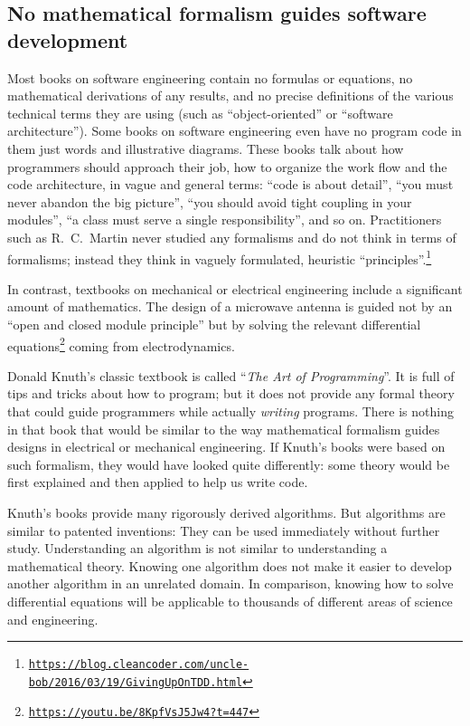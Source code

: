 \subsection{No mathematical formalism guides software development}

Most books on software engineering contain no formulas or equations,
no mathematical derivations of any results, and no precise definitions
of the various technical terms they are using (such as ``object-oriented''
or ``software architecture''). Some books on software engineering
even have no program code in them \textendash{} just words and illustrative
diagrams. These books talk about how programmers should approach their
job, how to organize the work flow and the code architecture, in vague
and general terms: ``code is about detail'', ``you must never abandon
the big picture'', ``you should avoid tight coupling in your modules'',
``a class must serve a single responsibility'', and so on. Practitioners
such as R.\ C.\ Martin never studied any formalisms and do not think
in terms of formalisms; instead they think in vaguely formulated,
heuristic \textquotedblleft principles\textquotedblright .\footnote{\texttt{\href{https://blog.cleancoder.com/uncle-bob/2016/03/19/GivingUpOnTDD.html}{https://blog.cleancoder.com/uncle-bob/2016/03/19/GivingUpOnTDD.html}}}

In contrast, textbooks on mechanical or electrical engineering include
a significant amount of mathematics. The design of a microwave antenna
is guided not by an ``open and closed module principle'' but by
solving the relevant differential equations\footnote{\texttt{\href{https://youtu.be/8KpfVsJ5Jw4?t=447}{https://youtu.be/8KpfVsJ5Jw4?t=447}}}
coming from electrodynamics.

Donald Knuth's classic textbook is called ``\emph{The Art of Programming}''.
It is full of tips and tricks about how to program; but it does not
provide any formal theory that could guide programmers while actually
\emph{writing} programs. There is nothing in that book that would
be similar to the way mathematical formalism guides designs in electrical
or mechanical engineering. If Knuth's books were based on such formalism,
they would have looked quite differently: some theory would be first
explained and then applied to help us write code.

Knuth's books provide many rigorously derived algorithms. But algorithms
are similar to patented inventions: They can be used immediately without
further study. Understanding an algorithm is not similar to understanding
a mathematical theory. Knowing one algorithm does not make it easier
to develop another algorithm in an unrelated domain. In comparison,
knowing how to solve differential equations will be applicable to
thousands of different areas of science and engineering.

